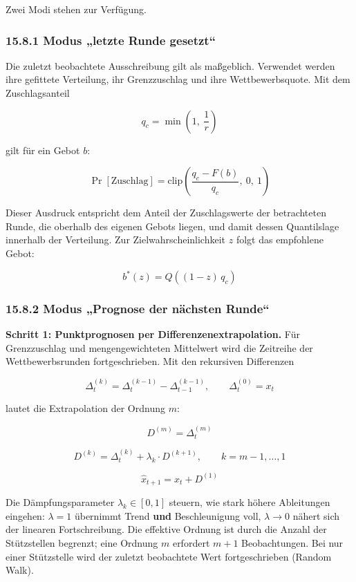 \documentclass[
  a4paper,
  10pt]{article}
\begin{document}
Zwei Modi stehen zur Verfügung.

\hypertarget{modus-letzte-runde-gesetzt}{%
\subsubsection{15.8.1 Modus „letzte Runde
gesetzt``}\label{modus-letzte-runde-gesetzt}}

Die zuletzt beobachtete Ausschreibung gilt als maßgeblich. Verwendet
werden ihre gefittete Verteilung, ihr Grenzzuschlag und ihre
Wettbewerbsquote. Mit dem Zuschlagsanteil

\[ q_c = \min\left(1,\ \frac{1}{r}\right) \]

gilt für ein Gebot \(b\):

\[ \Pr\left[\text{Zuschlag}\right] = \mathrm{clip}\left(\frac{q_c - F(b)}{q_c},\ 0,\ 1\right) \]

Dieser Ausdruck entspricht dem Anteil der Zuschlagswerte der
betrachteten Runde, die oberhalb des eigenen Gebots liegen, und damit
dessen Quantilslage innerhalb der Verteilung. Zur Zielwahrscheinlichkeit
\(z\) folgt das empfohlene Gebot:

\[ b^{*}(z) = Q\left((1-z)\, q_c\right) \]

\hypertarget{modus-prognose-der-nuxe4chsten-runde}{%
\subsubsection{15.8.2 Modus „Prognose der nächsten
Runde``}\label{modus-prognose-der-nuxe4chsten-runde}}

\textbf{Schritt 1: Punktprognosen per Differenzenextrapolation.} Für
Grenzzuschlag und mengengewichteten Mittelwert wird die Zeitreihe der
Wettbewerbsrunden fortgeschrieben. Mit den rekursiven Differenzen

\[ \Delta^{(k)}_t = \Delta^{(k-1)}_t - \Delta^{(k-1)}_{t-1}, \qquad \Delta^{(0)}_t = x_t \]

lautet die Extrapolation der Ordnung \(m\):

\[ D^{(m)} = \Delta^{(m)}_t \]

\[ D^{(k)} = \Delta^{(k)}_t + \lambda_k \cdot D^{(k+1)}, \qquad k = m-1, \dots, 1 \]

\[ \hat{x}_{t+1} = x_t + D^{(1)} \]

Die Dämpfungsparameter \(\lambda_k \in [0,1]\) steuern, wie stark höhere
Ableitungen eingehen: \(\lambda = 1\) übernimmt Trend \textbf{und}
Beschleunigung voll, \(\lambda \rightarrow 0\) nähert sich der linearen
Fortschreibung. Die effektive Ordnung ist durch die Anzahl der
Stützstellen begrenzt; eine Ordnung \(m\) erfordert \(m+1\)
Beobachtungen. Bei nur einer Stützstelle wird der zuletzt beobachtete
Wert fortgeschrieben (Random Walk).
\end{document}
